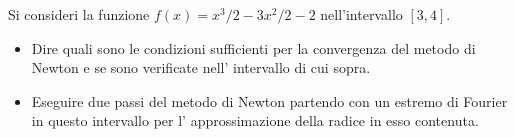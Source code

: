 Si consideri la funzione $f(x)=x^3/2 - 3x^2/2 -2$ nell'intervallo
$[3,4]$.

\begin{itemize}
\item Dire quali sono le condizioni sufficienti per la convergenza del metodo di
Newton e se sono verificate nell' intervallo di cui sopra.
\item Eseguire due passi del metodo di Newton partendo con un estremo di Fourier in questo intervallo
per l' approssimazione della radice in esso contenuta.
\end{itemize}
